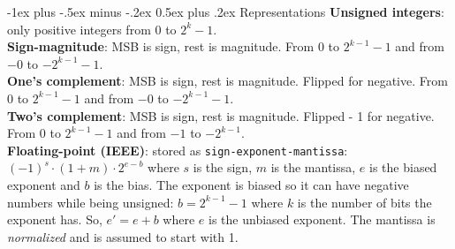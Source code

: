 \documentclass[10pt,landscape]{article}
\makeatletter
\renewcommand{\section}{\@startsection{section}{1}{0mm}%
                                {-1ex plus -.5ex minus -.2ex}%
                                {0.5ex plus .2ex}%
                                {\normalfont\small\bfseries}}
\makeatother
\begin{document}
\begin{multicols}{3}
\section{Representations}
\textbf{Unsigned integers}: only positive integers from $0$ to $2^k-1$.\\
\textbf{Sign-magnitude}: MSB is sign, rest is magnitude. From $0$ to $2^{k-1}-1$ and from $-0$ to $-2^{k-1}-1$.\\
\textbf{One's complement}: MSB is sign, rest is magnitude. Flipped for negative. From $0$ to $2^{k-1}-1$ and from $-0$ to $-2^{k-1}-1$.\\
\textbf{Two's complement}: MSB is sign, rest is magnitude. Flipped - 1 for negative. From $0$ to $2^{k-1}-1$ and from $-1$ to $-2^{k-1}$.\\
\textbf{Floating-point (IEEE)}: stored as \texttt{sign-exponent-mantissa}: $(-1)^s\cdot(1+m)\cdot 2^{e-b}$ where $s$ is the sign, $m$ is the mantissa, $e$ is the biased exponent and $b$ is the bias. The exponent is biased so it can have negative numbers while being unsigned: $b=2^{k-1}-1$ where $k$ is the number of bits the exponent has. So, $e'=e+b$ where $e$ is the unbiased exponent. The mantissa is \textit{normalized} and is assumed to start with 1.

\end{multicols}
\end{document}
